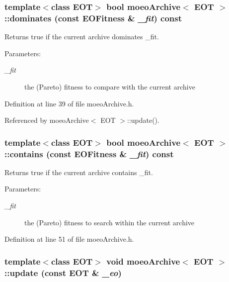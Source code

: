 \subsubsection{\setlength{\rightskip}{0pt plus 5cm}template$<$class EOT$>$ bool {\bf moeo\-Archive}$<$ EOT $>$::dominates (const {\bf EOFitness} \& {\em \_\-fit}) const\hspace{0.3cm}{\tt  [inline]}}\label{classmoeoArchive_7786c8bfe67fefa19ac31a4ac700df06}


Returns true if the current archive dominates \_\-fit. 

\begin{Desc}
\item[Parameters:]
\begin{description}
\item[{\em \_\-fit}]the (Pareto) fitness to compare with the current archive \end{description}
\end{Desc}


Definition at line 39 of file moeo\-Archive.h.

Referenced by moeo\-Archive$<$ EOT $>$::update().
\subsubsection{\setlength{\rightskip}{0pt plus 5cm}template$<$class EOT$>$ bool {\bf moeo\-Archive}$<$ EOT $>$::contains (const {\bf EOFitness} \& {\em \_\-fit}) const\hspace{0.3cm}{\tt  [inline]}}\label{classmoeoArchive_71feaf270daa7185e829caef40bbf956}


Returns true if the current archive contains \_\-fit. 

\begin{Desc}
\item[Parameters:]
\begin{description}
\item[{\em \_\-fit}]the (Pareto) fitness to search within the current archive \end{description}
\end{Desc}


Definition at line 51 of file moeo\-Archive.h.
\subsubsection{\setlength{\rightskip}{0pt plus 5cm}template$<$class EOT$>$ void {\bf moeo\-Archive}$<$ EOT $>$::update (const EOT \& {\em \_\-eo})\hspace{0.3cm}{\tt  [inline]}}\label{classmoeoArchive_be9f67bfe41c25537292056d5b30f56a}


